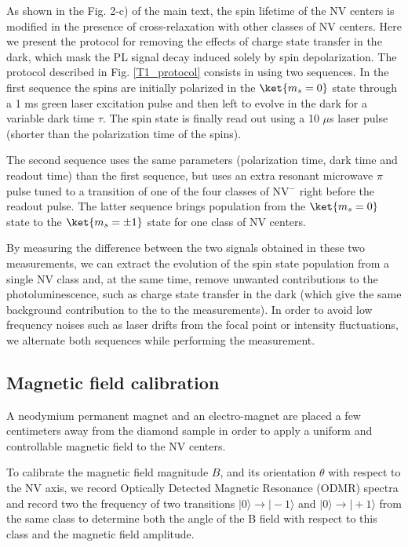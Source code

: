\documentclass[preprintnumbers,amsmath,amssymb,onecolumn,12pt]{revtex4}
\begin{document}
As shown in the Fig. 2-c) of the main text, the spin lifetime of the NV centers is modified in the presence of cross-relaxation with other classes of NV centers.
Here we present the protocol for removing the effects of charge state transfer in the dark, which mask the PL signal decay induced solely by spin depolarization. 
The protocol described in Fig. \ref{T1_protocol} consists in using two sequences. In the first sequence the spins are initially polarized in the $\ket{m_s=0}$ state through a 1 ms green laser excitation pulse and then left to evolve in the dark for a variable dark time $\tau$. The spin state is finally read out using a 10 $\mu$s laser pulse (shorter than the polarization time of the spins).

The second sequence uses the same parameters (polarization time, dark time and readout time) than the first sequence, but uses an extra resonant microwave $\pi$ pulse tuned to a transition of one of the four classes of NV$^-$ right before the readout pulse. The latter sequence brings population from the $\ket{m_s=0}$ state to the $\ket{m_s=\pm 1}$ state for one class of NV centers.

By measuring the difference between the two signals obtained in these two measurements, we can extract the evolution of the spin state population from a single NV class and, at the same time, remove unwanted contributions to the photoluminescence, such as charge state transfer in the dark (which give the same background contribution to the to the measurements).
In order to avoid low frequency noises such as laser drifts from the focal point or intensity fluctuations, we alternate both sequences while performing the measurement.

\subsection{Magnetic field calibration}

A neodymium permanent magnet and an electro-magnet are placed a few centimeters away from the diamond sample in order to apply a uniform and controllable magnetic field to the NV centers. 

To calibrate the magnetic field magnitude $B$, and its orientation $\theta$ with respect to the NV axis, we record Optically Detected Magnetic Resonance (ODMR) spectra and record two the frequency of two transitions $|0 \rangle \rightarrow |-1\rangle$ and $|0 \rangle \rightarrow |+1\rangle$ from the same class to determine both the angle of the B field with respect to this class and the magnetic field amplitude. 
\end{document}
